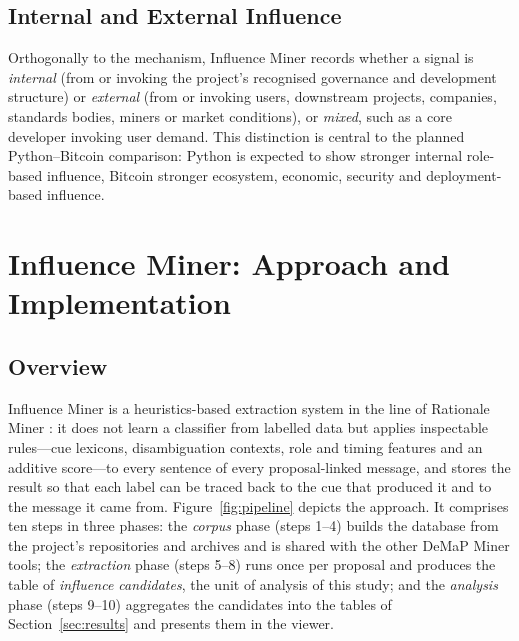 \documentclass[sigconf,screen]{acmart}
\begin{document}
\subsection{Internal and External Influence}

Orthogonally to the mechanism, Influence Miner records whether a signal is \emph{internal} (from or invoking the project's recognised governance and development structure) or \emph{external} (from or invoking users, downstream projects, companies, standards bodies, miners or market conditions), or \emph{mixed}, such as a core developer invoking user demand. This distinction is central to the planned Python--Bitcoin comparison: Python is expected to show stronger internal role-based influence, Bitcoin stronger ecosystem, economic, security and deployment-based influence.

\section{Influence Miner: Approach and Implementation}
\label{sec:approach}

\subsection{Overview}
\label{sec:overview}

Influence Miner is a heuristics-based extraction system in the line of Rationale Miner \cite{sharma2021rationale}: it does not learn a classifier from labelled data but applies inspectable rules---cue lexicons, disambiguation contexts, role and timing features and an additive score---to every sentence of every proposal-linked message, and stores the result so that each label can be traced back to the cue that produced it and to the message it came from. Figure~\ref{fig:pipeline} depicts the approach. It comprises ten steps in three phases: the \emph{corpus} phase (steps 1--4) builds the database from the project's repositories and archives and is shared with the other DeMaP Miner tools; the \emph{extraction} phase (steps 5--8) runs once per proposal and produces the table of \emph{influence candidates}, the unit of analysis of this study; and the \emph{analysis} phase (steps 9--10) aggregates the candidates into the tables of Section~\ref{sec:results} and presents them in the viewer.
\end{document}
